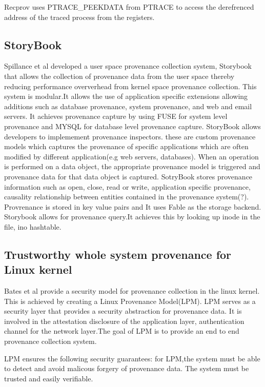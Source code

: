 Recprov uses PTRACE\_PEEKDATA from PTRACE to access the derefrenced address of the traced process from the registers. 

\subsection{StoryBook}
Spillance et al developed a user space provenance collection system, Storybook \cite{Rabinovich1995}  that allows the collection of provenance data from the user space thereby reducing performance oververhead from kernel space provenance collection. This system is modular.It allows the use of application specific extensions allowing additions such as database provenance, system provenance, and web and email servers. It achieves provenance capture by using FUSE for system level provenance and MYSQL for database level provenance capture. StoryBook allows developers to implemement provenance inspectors. these are custom provenance models which captures the provenance of specific applications which are often modified by different application(e.g web servers, databases). When an operation is performed on a data object, the appropriate provenance model is triggered and provenance data for that data object is captured. SotryBook stores provenance information such as open, close, read or write, application specific provenance, causality relationship between entities contained in the provenance system(?). Provrenance is stored in key value pairs and It uses Fable as the storage backend. Storybook allows for provenance query.It achieves this by looking up inode in the file, ino hashtable.

\subsection{Trustworthy whole system provenance for Linux kernel}

Bates et al provide a security model for provenance collection in the linux kernel. This is achieved by creating a Linux Provenance Model(LPM). LPM serves as a security layer that provides a security abstraction for provenance data. It is involved in the attestation disclosure of the application layer, authentication channel for the network layer.The goal of LPM is to provide an end to end provenance collection system. 

LPM ensures the following security guarantees: for LPM,the system must be able to detect and avoid malicous forgery of provenance data. The system must be trusted and easily verifiable. 

